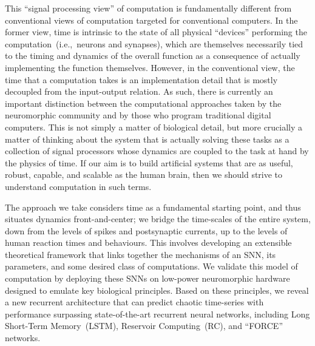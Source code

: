 This ``signal processing view'' of computation is fundamentally different from conventional views of computation targeted for conventional computers.
In the former view, time is intrinsic to the state of all physical ``devices'' performing the computation~(i.e.,~neurons and synapses), which are themselves necessarily tied to the timing and dynamics of the overall function as a consequence of actually implementing the function themselves.
However, in the conventional view, the time that a computation takes is an implementation detail that is mostly decoupled from the input-output relation.
As such, there is currently an important distinction between the computational approaches taken by the neuromorphic community and by those who program traditional digital computers.
This is not simply a matter of biological detail, but more crucially a matter of thinking about the system that is actually solving these tasks as a collection of signal processors whose dynamics are coupled to the task at hand by the physics of time.
If our aim is to build artificial systems that are as useful, robust, capable, and scalable as the human brain, then we should strive to understand computation in such terms.

The approach we take considers time as a fundamental starting point, and thus situates dynamics front-and-center; we bridge the time-scales of the entire system, down from the levels of spikes and postsynaptic currents, up to the levels of human reaction times and behaviours. 
This involves developing an extensible theoretical framework that links together the mechanisms of an SNN, its parameters, and some desired class of computations.
We validate this model of computation by deploying these SNNs on low-power neuromorphic hardware designed to emulate key biological principles.
Based on these principles, we reveal a new recurrent architecture that can predict chaotic time-series with performance surpassing state-of-the-art recurrent neural networks, including Long Short-Term Memory~(LSTM), Reservoir Computing~(RC), and ``FORCE'' networks.

